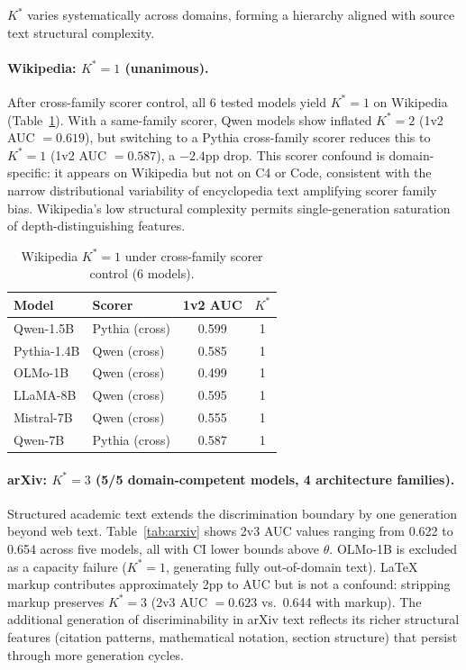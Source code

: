 \documentclass[11pt,a4paper]{article}
\begin{document}
$K^*$ varies systematically across domains, forming a hierarchy aligned with source text structural complexity.

\paragraph{Wikipedia: $K^*\!=\!1$ (unanimous).} After cross-family scorer control, all 6 tested models yield $K^*\!=\!1$ on Wikipedia (Table~\ref{tab:wiki}). With a same-family scorer, Qwen models show inflated $K^*\!=\!2$ (1v2 AUC $= 0.619$), but switching to a Pythia cross-family scorer reduces this to $K^*\!=\!1$ (1v2 AUC $= 0.587$), a $-2.4$pp drop. This scorer confound is domain-specific: it appears on Wikipedia but not on C4 or Code, consistent with the narrow distributional variability of encyclopedia text amplifying scorer family bias. Wikipedia's low structural complexity permits single-generation saturation of depth-distinguishing features.

\begin{table}[t]
\centering
\small
\caption{Wikipedia $K^*\!=\!1$ under cross-family scorer control (6 models).}
\label{tab:wiki}
\begin{tabular}{llcc}
\toprule
Model & Scorer & 1v2 AUC & $K^*$ \\
\midrule
Qwen-1.5B     & Pythia (cross) & 0.599 & 1 \\
Pythia-1.4B   & Qwen (cross)   & 0.585 & 1 \\
OLMo-1B       & Qwen (cross)   & 0.499 & 1 \\
LLaMA-8B      & Qwen (cross)   & 0.595 & 1 \\
Mistral-7B    & Qwen (cross)   & 0.555 & 1 \\
Qwen-7B       & Pythia (cross) & 0.587 & 1 \\
\bottomrule
\end{tabular}
\end{table}

\paragraph{arXiv: $K^*\!=\!3$ (5/5 domain-competent models, 4 architecture families).}
Structured academic text extends the discrimination boundary by one generation beyond web text. Table~\ref{tab:arxiv} shows 2v3 AUC values ranging from 0.622 to 0.654 across five models, all with CI lower bounds above $\theta$. OLMo-1B is excluded as a capacity failure ($K^*\!=\!1$, generating fully out-of-domain text). LaTeX markup contributes approximately 2pp to AUC but is not a confound: stripping markup preserves $K^*\!=\!3$ (2v3 AUC $= 0.623$ vs.\ 0.644 with markup). The additional generation of discriminability in arXiv text reflects its richer structural features (citation patterns, mathematical notation, section structure) that persist through more generation cycles.
\end{document}

